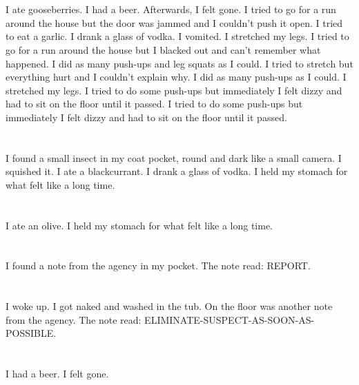 \documentclass{article}
\begin{document}
    \section{}
    I ate gooseberries. I had a beer. Afterwards, I felt gone. I tried to go for a run around the house but the door was jammed and I couldn't push it open. I tried to eat a garlic. I drank a glass of vodka. I vomited.  I stretched my legs.  I tried to go for a run around the house but I blacked out and can't remember what happened.  I did as many push-ups and leg squats as I could.  I tried to stretch but everything hurt and I couldn't explain why.   I did as many push-ups as I could.  I stretched my legs.  I tried to do some push-ups but immediately I felt dizzy and had to sit on the floor until it passed.  I tried to do some push-ups but immediately I felt dizzy and had to sit on the floor until it passed.  
    \newpage
    
    \section{}
    I found a small insect in my coat pocket, round and dark like a small camera. I squished it. I ate a blackcurrant. I drank a glass of vodka. I held my stomach for what felt like a long time.  
    \newpage
    
    \section{}
    I ate an olive. I held my stomach for what felt like a long time.  
    \newpage
    
    \section{}
    I found a note from the agency in my pocket. The note read: REPORT.  
    \newpage
    
    \section{}
    I woke up. I got naked and washed in the tub. On the floor was another note from the agency. The note read: ELIMINATE-SUSPECT-AS-SOON-AS-POSSIBLE.  
    \newpage
    
    \section{}
    I had a beer. I felt gone.  
    \newpage
    
\end{document}
